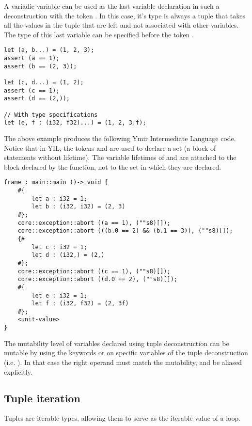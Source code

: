A variadic variable can be used as the last variable declaration in such a
deconstruction with the token . In this case, it's type is always a
tuple that takes all the values in the tuple that are left and not associated
with other variables. The type of this last variable can be specified before the
token .

\begin{lstlisting}[style=coloredverbatim]
let (a, b...) = (1, 2, 3);
assert (a == 1);
assert (b == (2, 3));

let (c, d...) = (1, 2);
assert (c == 1);
assert (d == (2,));

// With type specifications
let (e, f : (i32, f32)...) = (1, 2, 3.f);
\end{lstlisting}

The above example produces the following Ymir Intermediate Language code. Notice
that in YIL, the tokens \token{\#\{} and \token{\#\} } are used to declare a
set (a block of statements without lifetime). The variable lifetimes of 
and  are attached to the block declared by the function, not to the
set in which they are declared.

\begin{lstlisting}[style=intermediateVerb]
frame : main::main ()-> void {
    #{
        let a : i32 = 1;
        let b : (i32, i32) = (2, 3)
    #};
    core::exception::abort ((a == 1), (""s8)[]);
    core::exception::abort (((b.0 == 2) && (b.1 == 3)), (""s8)[]);
    {#
        let c : i32 = 1;
        let d : (i32,) = (2,)
    #};
    core::exception::abort ((c == 1), (""s8)[]);
    core::exception::abort ((d.0 == 2), (""s8)[]);
    #{
        let e : i32 = 1;
        let f : (i32, f32) = (2, 3f)
    #};
    <unit-value>
}
\end{lstlisting}

The mutability level of variables declared using tuple deconstruction can be
mutable by using the keywords  or  on specific
variables of the tuple deconstruction (i.e. ). In that case the right operand must match the mutability, and be aliased
explicitly.

\subsection {Tuple iteration}

Tuples are iterable types, allowing them to serve as the iterable value of a  loop.

